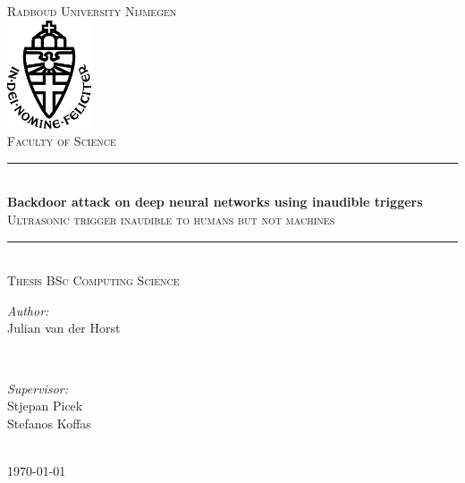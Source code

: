\documentclass{report}
\title{\thesistitle}
\author{\thesisauthorfirst\space\thesisauthorsecond}
\date{\thesisdate}
\def\thesistitle{Backdoor attack on deep neural networks using inaudible triggers}
\def\thesissubtitle{Ultrasonic trigger inaudible to humans but not machines}
\def\thesisauthorfirst{Julian van der Horst}
\def\thesisauthorsecond{}
\def\thesissupervisorfirst{Stjepan Picek\\Stefanos Koffas}
\def\thesissupervisorsecond{}
\def\thesissecondreaderfirst{}
\def\thesissecondreadersecond{}
\def\thesisdate{May 2023}
\theoremstyle{definition}
\theoremstyle{remark}
\begin{document}
\begin{titlepage}
	\thispagestyle{empty}
	\newcommand{\HRule}{\rule{\linewidth}{0.5mm}}
	\center
	\textsc{\Large Radboud University Nijmegen}\\[.7cm]
	\includegraphics[width=25mm]{img/in_dei_nomine_feliciter.eps}\\[.5cm]
	\textsc{Faculty of Science}\\[0.5cm]
	
	\HRule \\[0.4cm]
	{ \huge \bfseries \thesistitle}\\[0.1cm]
	\textsc{\thesissubtitle}\\
	\HRule \\[.5cm]
	\textsc{\large Thesis BSc Computing Science}\\[.5cm]
	
	\begin{minipage}{0.4\textwidth}
	\begin{flushleft} \large
	\emph{Author:}\\
	\thesisauthorfirst\space \textsc{\thesisauthorsecond}
	\end{flushleft}
	\end{minipage}
	~
	\begin{minipage}{0.4\textwidth}
	\begin{flushright} \large
	\emph{Supervisor:} \\
	\thesissupervisorfirst\space \textsc{\thesissupervisorsecond} \\[1em]
	\end{flushright}
	\end{minipage}\\[4cm]
	\vfill
	{\large \today}\\
	\clearpage
\end{titlepage}

\tableofcontents

\newpage
\end{document}
